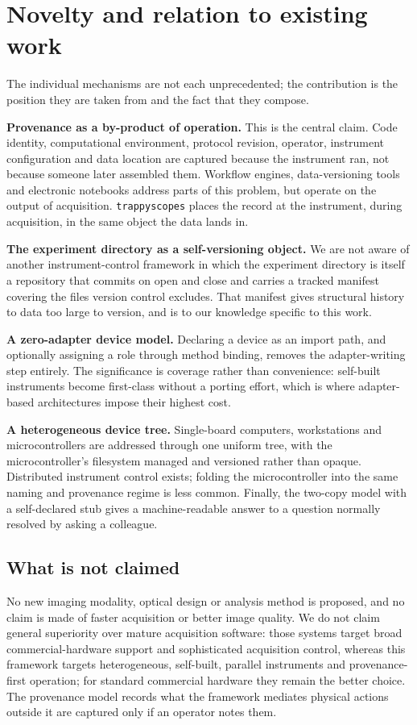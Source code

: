 \documentclass[10pt,a4paper,twocolumn]{article}
\begin{document}
\section{Novelty and relation to existing work}

The individual mechanisms are not each unprecedented; the contribution is the position
they are taken from and the fact that they compose.

\textbf{Provenance as a by-product of operation.} This is the central claim. Code
identity, computational environment, protocol revision, operator, instrument
configuration and data location are captured because the instrument ran, not because
someone later assembled them. Workflow engines, data-versioning tools and electronic
notebooks address parts of this problem, but operate on the output of acquisition.
\texttt{trappyscopes} places the record at the instrument, during acquisition, in the
same object the data lands in.

\textbf{The experiment directory as a self-versioning object.} We are not aware of
another instrument-control framework in which the experiment directory is itself a
repository that commits on open and close and carries a tracked manifest covering the
files version control excludes. That manifest gives structural history to data too
large to version, and is to our knowledge specific to this work.

\textbf{A zero-adapter device model.} Declaring a device as an import path, and
optionally assigning a role through method binding, removes the adapter-writing step
entirely. The significance is coverage rather than convenience: self-built instruments
become first-class without a porting effort, which is where adapter-based
architectures impose their highest cost.

\textbf{A heterogeneous device tree.} Single-board computers, workstations and
microcontrollers are addressed through one uniform tree, with the microcontroller's
filesystem managed and versioned rather than opaque. Distributed instrument control
exists; folding the microcontroller into the same naming and provenance regime is less
common. Finally, the two-copy model with a self-declared stub gives a machine-readable
answer to a question normally resolved by asking a colleague.

\subsection*{What is not claimed}
No new imaging modality, optical design or analysis method is proposed, and no claim is
made of faster acquisition or better image quality. We do not claim general superiority
over mature acquisition software: those systems target broad commercial-hardware support
and sophisticated acquisition control, whereas this framework targets heterogeneous,
self-built, parallel instruments and provenance-first operation; for standard commercial
hardware they remain the better choice. The provenance model records what the framework
mediates \textemdash{} physical actions outside it are captured only if an operator notes
them.
\end{document}
